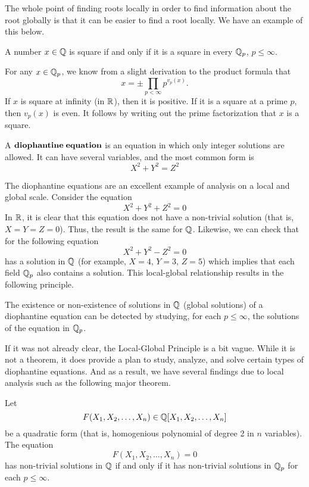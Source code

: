 \documentclass[a4paper]{article}
\begin{document}
The whole point of finding roots locally in order to find information 
about the root globally is that it can be easier to find a root locally. 
We have an example of this below.

\begin{proposition}
A number $x\in\mathbb Q$ is square if and only if it is a square in every 
$\mathbb Q_p$, $p\leq\infty$.
\end{proposition}
\begin{solution}
For any $x\in\mathbb Q_p$,  we know from a slight derivation to the product
formula that 
\[
	x=\pm\prod_{p<\infty}p^{v_p(x)}.
\]
If $x$ is square at infinity (in $\mathbb R$), then it is positive.  If it is
a square at a prime $p$, then $v_p(x)$ is even.  It follows by
writing out the prime factorization that $x$ is a square.
\end{solution}

\begin{definition}
A $\bf{diophantine\;equation}$ is an equation in which only integer
solutions are allowed.  It can have several variables, and the most
common form is
\[
	X^2+Y^2=Z^2
\]
\end{definition}

The diophantine equations are an excellent example of analysis on a local 
and global scale.  Consider the equation
\[
  X^2+Y^2+Z^2=0
\]
In $\mathbb R$, it is clear that this equation does not have a non-trivial 
solution (that is, $X=Y=Z=0$).  Thus, the result is the same for $\mathbb Q$.
Likewise, we can check that for the following equation
\[
  X^2+Y^2-Z^2=0
\]
has a solution in $\mathbb Q$ (for example, $X=4$, $Y=3$, $Z=5$) which 
implies that each field $\mathbb Q_p$ also contains a solution.  This 
local-global relationship results in the following principle.

\begin{definition}
The existence or non-existence of solutions in $\mathbb Q$ (global solutions)
of a diophantine equation can be detected by studying, for each
$p\leq\infty$, the solutions of the equation in $\mathbb Q_p$.
\end{definition}

If it was not already clear, the Local-Global Principle is a bit  
vague.  While it is not a theorem, it does provide a plan to study,
analyze, and solve certain types of diophantine equations.  And as a
result, we have several findings due to local analysis such as the
following major theorem.

\begin{theorem}
Let
\[
	F(X_1,X_2,\dots,X_n)\in\mathbb Q[X_1,X_2,\dots,X_n]
\]
be a quadratic form (that is, homogenious polynomial of degree 2 in $n$ 
variables).  The equation
\[
	F(X_1,X_2,\dots,X_n)=0
\]
has non-trivial solutions in $\mathbb Q$ if and only if it has non-trivial
solutions in $\mathbb Q_p$ for each $p\leq\infty$.
\end{theorem}
\end{document}
